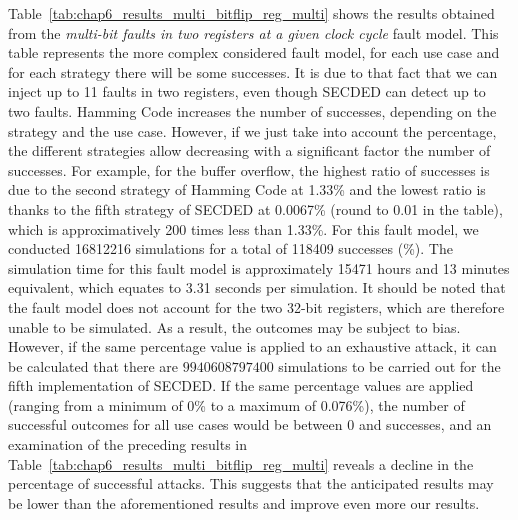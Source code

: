 Table~\ref{tab:chap6_results_multi_bitflip_reg_multi} shows the results obtained from the \textit{multi-bit faults in two registers at a given clock cycle} fault model. This table represents the more complex considered fault model, for each use case and for each strategy there will be some successes. It is due to that fact that we can inject up to 11 faults in two registers, even though SECDED can detect up to two faults. Hamming Code increases the number of successes, depending on the strategy and the use case. However, if we just take into account the percentage, the different strategies allow decreasing with a significant factor the number of successes. For example, for the buffer overflow, the highest ratio of successes is due to the second strategy of Hamming Code at 1.33\% and the lowest ratio is thanks to the fifth strategy of SECDED at 0.0067\% (round to 0.01 in the table), which is approximatively 200 times less than 1.33\%. For this fault model, we conducted \num{16812216} simulations for a total of \num{118409} successes (\%). The simulation time for this fault model is approximately \num{15471} hours and 13 minutes equivalent, which equates to 3.31 seconds per simulation.
It should be noted that the fault model does not account for the two 32-bit registers, which are therefore unable to be simulated. As a result, the outcomes may be subject to bias. However, if the same percentage value is applied to an exhaustive attack, it can be calculated that there are $\num{9940608797400}$ simulations to be carried out for the fifth implementation of SECDED. If the same percentage values are applied (ranging from a minimum of 0\% to a maximum of 0.076\%), the number of successful outcomes for all use cases would be between 0 and  successes, and an examination of the preceding results in Table~\ref{tab:chap6_results_multi_bitflip_reg_multi} reveals a decline in the percentage of successful attacks. This suggests that the anticipated results may be lower than the aforementioned results and improve even more our results.

